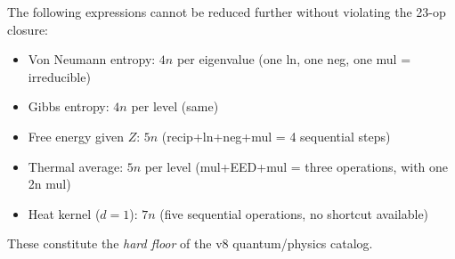 \documentclass[11pt]{article}
\begin{document}
The following expressions cannot be reduced further without violating the 23-op closure:

\begin{itemize}
  \item Von Neumann entropy: $4n$ per eigenvalue (one ln, one neg, one mul = irreducible)
  \item Gibbs entropy: $4n$ per level (same)
  \item Free energy given $Z$: $5n$ (recip+ln+neg+mul = 4 sequential steps)
  \item Thermal average: $5n$ per level (mul+EED+mul = three operations, with one 2n mul)
  \item Heat kernel ($d=1$): $7n$ (five sequential operations, no shortcut available)
\end{itemize}

These constitute the \emph{hard floor} of the v8 quantum/physics catalog.
\end{document}
